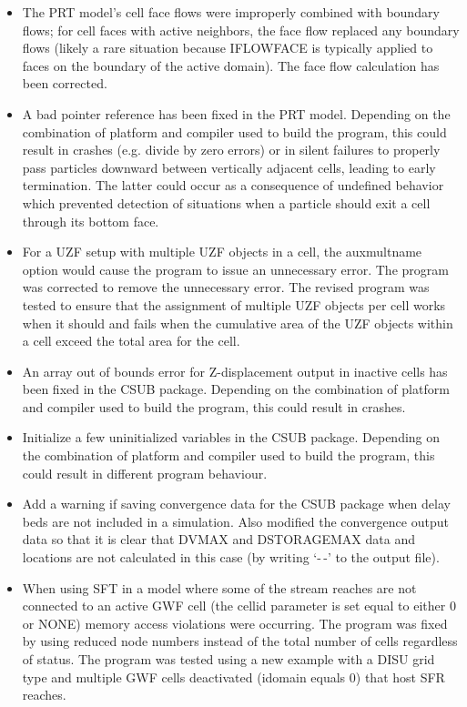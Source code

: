 \begin{itemize}
		\item The PRT model's cell face flows were improperly combined with boundary flows; for cell faces with active neighbors, the face flow replaced any boundary flows (likely a rare situation because IFLOWFACE is typically applied to faces on the boundary of the active domain). The face flow calculation has been corrected.
		\item A bad pointer reference has been fixed in the PRT model. Depending on the combination of platform and compiler used to build the program, this could result in crashes (e.g. divide by zero errors) or in silent failures to properly pass particles downward between vertically adjacent cells, leading to early termination. The latter could occur as a consequence of undefined behavior which prevented detection of situations when a particle should exit a cell through its bottom face.
		\item For a UZF setup with multiple UZF objects in a cell, the auxmultname option would cause the program to issue an unnecessary error.  The program was corrected to remove the unnecessary error.  The revised program was tested to ensure that the assignment of multiple UZF objects per cell works when it should and fails when the cumulative area of the UZF objects within a cell exceed the total area for the cell.
		\item An array out of bounds error for Z-displacement output in inactive cells has been fixed in the CSUB package. Depending on the combination of platform and compiler used to build the program, this could result in crashes.
		\item Initialize a few uninitialized variables in the CSUB package. Depending on the combination of platform and compiler used to build the program, this could result in different program behaviour.
		\item Add a warning if saving convergence data for the CSUB package when delay beds are not included in a simulation. Also modified the convergence output data so that it is clear that DVMAX and DSTORAGEMAX data and locations are not calculated in this case (by writing `-\,-' to the output file). 
		\item When using SFT in a model where some of the stream reaches are not connected to an active GWF cell (the cellid parameter is set equal to either 0 or NONE) memory access violations were occurring.  The program was fixed by using reduced node numbers instead of the total number of cells regardless of status.  The program was tested using a new example with a DISU grid type and multiple GWF cells deactivated (idomain equals 0) that host SFR reaches.
	\end{itemize}

